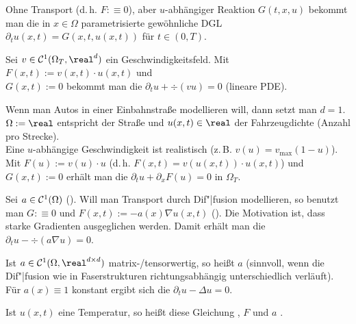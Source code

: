 \linie

\begin{Bsp}
    Ohne Transport (d.\,h. $F :\equiv 0$), aber $u$-abhängiger Reaktion $G(t, x, u)$ bekommt man
    die in $x \in \Omega$ parametrisierte gewöhnliche DGL
    $\partial_t u(x, t) = G(x, t, u(x, t))$ für $t \in (0, T)$.
\end{Bsp}

\linie

\begin{Bsp}
    Sei $v \in \C^1(\Omega_T, \real^d)$ ein Geschwindigkeitsfeld.
    Mit $F(x, t) := v(x, t) \cdot u(x, t)$ und\\
    $G(x, t) := 0$ bekommt man die
     $\partial_t u + \div(vu) = 0$
    (lineare PDE).
\end{Bsp}

\linie

\begin{Bsp}
    Wenn man Autos in einer Einbahnstraße modellieren will,
    dann setzt man $d = 1$.
    $\Omega := \real$ entspricht der Straße
    und $u(x, t) \in \real$ der Fahrzeugdichte (Anzahl pro Strecke).\\
    Eine $u$-abhängige Geschwindigkeit ist realistisch (z.\,B. $v(u) = v_{\max}(1 - u)$).\\
    Mit $F(u) := v(u) \cdot u$ (d.\,h. $F(x, t) = v(u(x, t)) \cdot u(x, t)$)
    und $G(x, t) := 0$ erhält man die 
    $\partial_t u + \partial_x F(u) = 0$ in $\Omega_T$.
\end{Bsp}

\linie
\pagebreak

\begin{Bsp}
    Sei $a \in \mathcal{C}^1(\Omega)$ ().
    Will man Transport durch Dif"|fusion modellieren, so benutzt man
    $G :\equiv 0$ und $F(x, t) := -a(x) \nabla u(x, t)$ ().
    Die Motivation ist, dass starke Gradienten ausgeglichen werden.
    Damit erhält man die 
    $\partial_t u - \div(a \nabla u) = 0$.
    
    Ist $a \in \C^1(\Omega, \real^{d \times d})$ matrix-/tensorwertig, so heißt $a$
     (sinnvoll, wenn die Dif"|fusion wie in Faserstrukturen
    richtungsabhängig unterschiedlich verläuft).
    Für $a(x) \equiv 1$ konstant ergibt sich die 
    $\partial_t u - \Delta u = 0$.
    
    Ist $u(x, t)$ eine Temperatur, so heißt diese Gleichung
    ,
    $F$  und $a$ .
\end{Bsp}


